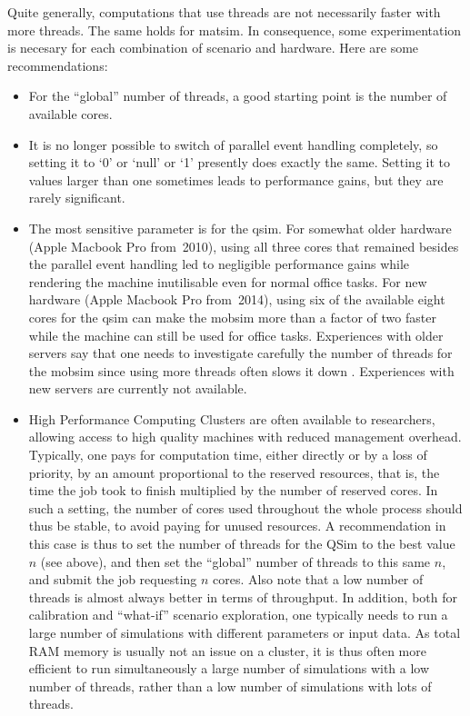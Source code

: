 Quite generally, computations that use threads are not necessarily faster with more threads. The same holds for \gls{matsim}.  In consequence, some experimentation is necesary for each combination of scenario and hardware.  Here are some recommendations:
\begin{itemize}\styleItemize

\item For the ``global'' number of threads, a good starting point is the number of available cores.

\item It is no longer possible to switch of parallel event handling completely, so setting it to `0' or `null' or `1' presently does exactly the same.  Setting it to values larger than one sometimes leads to performance gains, but they are rarely significant.

\item The most sensitive parameter is for the \gls{qsim}.
  For somewhat older hardware (\eg Apple Macbook Pro from~2010), using all three cores that remained besides the parallel event handling led to negligible performance gains while rendering the machine inutilisable even for normal office tasks.
  For new hardware (\eg Apple Macbook Pro from~2014), using six of the available eight cores for the \gls{qsim} can make the \gls{mobsim} more than a factor of two faster while the machine can still be used for office tasks.
  Experiences with older servers say that one needs to investigate carefully the number of threads for the \gls{mobsim} since using more threads often slows it down \citep{Dobler_PhDThesis_2013}.
  Experiences with new servers are currently not available. 
  \item High Performance Computing Clusters are often available to researchers, allowing access to high quality machines with reduced management overhead. Typically, one pays for computation time, either directly or by a loss of priority, by an amount proportional to the reserved resources, that is, the time the job took to finish multiplied by the number of reserved cores. In such a setting, the number of cores used throughout the whole process should thus be stable, to avoid paying for unused resources. A recommendation in this case is thus to set the number of threads for the QSim to the best value $n$ (see above), and then set the ``global'' number of threads to this same $n$, and submit the job requesting $n$ cores.
	  Also note that a low number of threads is almost always better in terms of throughput.
	  In addition, both for calibration and ``what-if'' scenario exploration,
	  one typically needs to run a large number of simulations with different parameters or
	  input data.
	  As total RAM memory is usually not an issue on a cluster,
	  it is thus often more efficient to run simultaneously a large number of simulations
	  with a low number of threads, rather than a low number of simulations with lots of threads.

\end{itemize}

